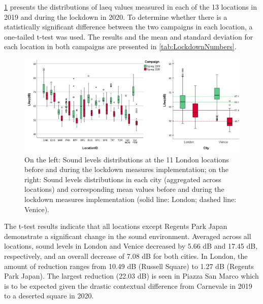 \cref{fig:NsMapLockLAeq} presents the distributions of \gls{laeq} values measured in each of the 13 locations in 2019 and during the lockdown in 2020. To determine whether there is a statistically significant difference between the two campaigns in each location, a one-tailed t-test was used. The results and the mean and standard deviation for each location in both campaigns are presented in \cref{tab:LockdownNumbers}. 


\begin{figure}[h]
  \centering
  \includegraphics[width=\textwidth]{Figures/LockdownLAeqCombined.png}
  \caption{On the left: Sound levels distributions at the 11 London locations before and during the lockdown measures implementation; on the right: Sound levels distributions in each city (aggregated across locations) and corresponding mean values before and during the lockdown measures implementation (solid line: London; dashed line: Venice). \label{fig:NsMapLockLAeq}}
\end{figure}



The t-test results indicate that all locations except Regents Park Japan demonstrate a significant change in the sound environment. Averaged across all locations, sound levels in London and Venice decreased by 5.66 dB and 17.45 dB, respectively, and an overall decrease of 7.08 dB for both cities. In London, the amount of reduction ranges from 10.49 dB (Russell Square) to 1.27 dB (Regents Park Japan). The largest reduction (22.03 dB) is seen in Piazza San Marco which is to be expected given the drastic contextual difference from Carnevale in 2019 to a deserted square in 2020. 

